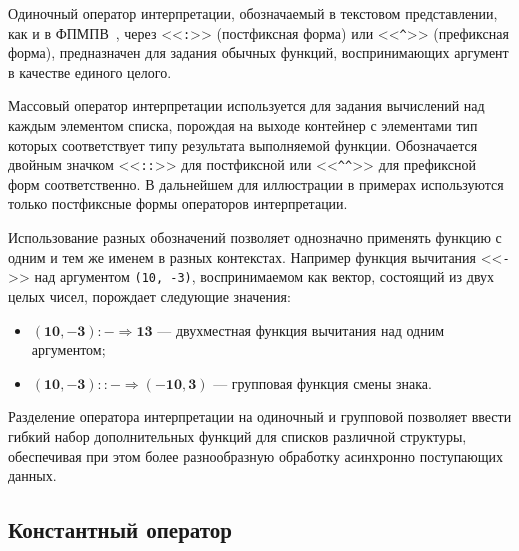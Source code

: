 Одиночный оператор интерпретации, обозначаемый в текстовом представлении, как и в ФПМПВ~\cite{legalov2005}, через <<\texttt{:}>> (постфиксная форма) или <<\texttt{\textasciicircum}>> (префиксная форма), предназначен для задания обычных функций, воспринимающих аргумент в качестве единого целого.

Массовый оператор интерпретации используется для задания вычислений над каждым элементом списка, порождая на выходе контейнер с элементами тип которых  соответствует типу результата выполняемой функции. Обозначается двойным значком <<\texttt{::}>> для постфиксной или <<\texttt{\textasciicircum\textasciicircum}>>  для префиксной форм соответственно. В дальнейшем для иллюстрации в примерах используются только постфиксные формы операторов интерпретации.

Использование разных обозначений позволяет однозначно применять функцию с одним и тем же именем в разных контекстах. Например функция вычитания <<\texttt{-}>> над аргументом \texttt{(10, -3)}, воспринимаемом как вектор, состоящий из двух целых чисел, порождает следующие значения:
\begin{itemize}
	\item $\mathbf{(10, -3):- \Rightarrow 13}$ --- двухместная функция вычитания над одним аргументом;
	\item $\mathbf{(10, -3)::- \Rightarrow (-10, 3)}$ --- групповая функция смены знака.
\end{itemize}

Разделение оператора интерпретации на одиночный и групповой позволяет ввести гибкий набор дополнительных функций для списков различной структуры, обеспечивая при этом более разнообразную обработку асинхронно поступающих данных.

\subsection{Константный оператор}


